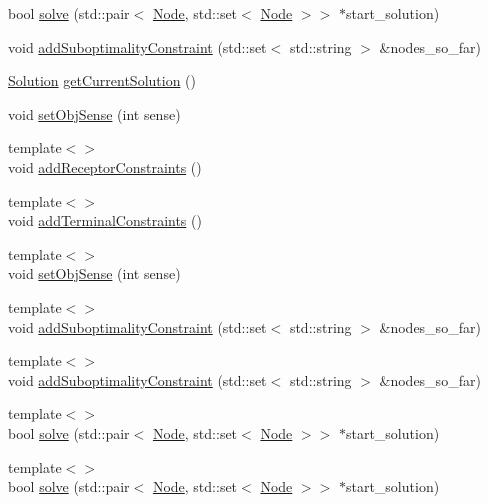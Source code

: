 \begin{DoxyCompactItemize}
\item 
bool \hyperlink{classderegnet_1_1DeregnetModel_af8ca1da09f5a7ebe517fa62249d0b1ab}{solve} (std\+::pair$<$ \hyperlink{namespacederegnet_a744bad34f2de9856d36715a445f027f3}{Node}, std\+::set$<$ \hyperlink{namespacederegnet_a744bad34f2de9856d36715a445f027f3}{Node} $>$$>$ $\ast$start\+\_\+solution)
\item 
void \hyperlink{classderegnet_1_1DeregnetModel_a7cac8e5496b44f04ecf7ff9e450e9a6e}{add\+Suboptimality\+Constraint} (std\+::set$<$ std\+::string $>$ \&nodes\+\_\+so\+\_\+far)
\item 
\hyperlink{structderegnet_1_1Solution}{Solution} \hyperlink{classderegnet_1_1DeregnetModel_a51e1c5476b2425a143908609e75d098a}{get\+Current\+Solution} ()
\item 
void \hyperlink{classderegnet_1_1DeregnetModel_adf44f15b2e57acc52c0ba9cca134b33e}{set\+Obj\+Sense} (int sense)
\item 
{\footnotesize template$<$$>$ }\\void \hyperlink{classderegnet_1_1DeregnetModel_ae83f5316463b9296089fa4c2a2f81635}{add\+Receptor\+Constraints} ()
\item 
{\footnotesize template$<$$>$ }\\void \hyperlink{classderegnet_1_1DeregnetModel_acce4019d184420af47bbc9c38f06a33c}{add\+Terminal\+Constraints} ()
\item 
{\footnotesize template$<$$>$ }\\void \hyperlink{classderegnet_1_1DeregnetModel_a903aeabb989a5138f22ccb99198852da}{set\+Obj\+Sense} (int sense)
\item 
{\footnotesize template$<$$>$ }\\void \hyperlink{classderegnet_1_1DeregnetModel_a37d1e4b40f89d3f198196863a8c1d321}{add\+Suboptimality\+Constraint} (std\+::set$<$ std\+::string $>$ \&nodes\+\_\+so\+\_\+far)
\item 
{\footnotesize template$<$$>$ }\\void \hyperlink{classderegnet_1_1DeregnetModel_a266c4a7f90a2884512f98ddcca6750bc}{add\+Suboptimality\+Constraint} (std\+::set$<$ std\+::string $>$ \&nodes\+\_\+so\+\_\+far)
\item 
{\footnotesize template$<$$>$ }\\bool \hyperlink{classderegnet_1_1DeregnetModel_a92c977d9b126c69653401fc45d43879c}{solve} (std\+::pair$<$ \hyperlink{namespacederegnet_a744bad34f2de9856d36715a445f027f3}{Node}, std\+::set$<$ \hyperlink{namespacederegnet_a744bad34f2de9856d36715a445f027f3}{Node} $>$$>$ $\ast$start\+\_\+solution)
\item 
{\footnotesize template$<$$>$ }\\bool \hyperlink{classderegnet_1_1DeregnetModel_a04b8bcc3b59819f10917a6cbb4dea487}{solve} (std\+::pair$<$ \hyperlink{namespacederegnet_a744bad34f2de9856d36715a445f027f3}{Node}, std\+::set$<$ \hyperlink{namespacederegnet_a744bad34f2de9856d36715a445f027f3}{Node} $>$$>$ $\ast$start\+\_\+solution)
\end{DoxyCompactItemize}
